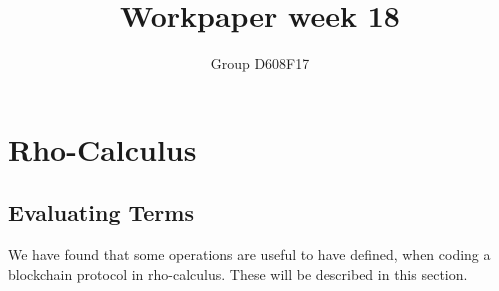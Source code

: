 

\setlength{\parindent}{0pt}
\author{Group D608F17}
\title{Workpaper week 18}



\maketitle
\section{Rho-Calculus}





\subsection{Evaluating Terms}
We have found that some operations are useful to have defined, when coding a blockchain protocol in rho-calculus. These will be described in this section.









\grid
\grid
